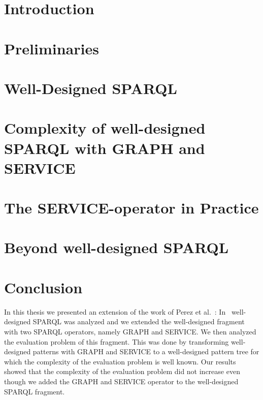 \documentclass[draft,final]{vutinfth} %
\begin{document}

\tableofcontents %

\mainmatter

\chapter{Introduction}


\chapter{Preliminaries}


\chapter{Well-Designed SPARQL}


\chapter{Complexity of well-designed SPARQL with GRAPH and SERVICE}


\chapter{The SERVICE-operator in Practice}\label{chapter:serviceeval}


\chapter{Beyond well-designed SPARQL}


\chapter{Conclusion}
In this thesis we presented an extension of the work of Perez et
al.~\cite{perez2009semantics}: In~\cite{perez2009semantics} well-designed SPARQL
was analyzed and we
extended the well-designed fragment with two SPARQL operators, namely GRAPH and SERVICE.
We then analyzed the evaluation problem of this fragment. This was done by
transforming well-designed patterns with GRAPH and SERVICE to a well-designed
pattern tree for which the complexity of the evaluation problem is well
known. Our results showed
that the complexity of the evaluation problem did not increase even though we
added the GRAPH and SERVICE operator to the well-designed SPARQL fragment.
\end{document}
